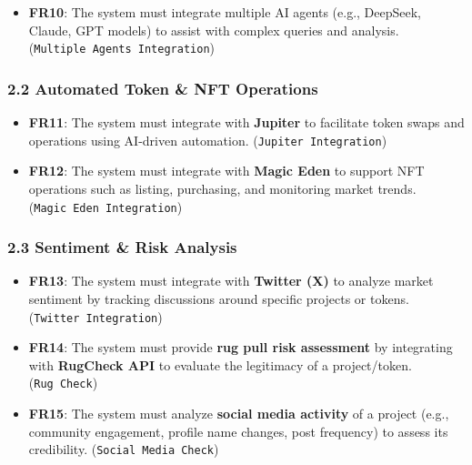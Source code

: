 \documentclass[
]{article}
\providecommand{\tightlist}{%
  \setlength{\itemsep}{0pt}\setlength{\parskip}{0pt}}
\begin{document}
\begin{itemize}
\tightlist
\item
  \textbf{FR10}: The system must integrate multiple AI agents (e.g.,
  DeepSeek, Claude, GPT models) to assist with complex queries and
  analysis. (\texttt{Multiple\ Agents\ Integration})
\end{itemize}

\hypertarget{automated-token-nft-operations}{%
\subsubsection{\texorpdfstring{\textbf{2.2 Automated Token \& NFT
Operations}}{2.2 Automated Token \& NFT Operations}}\label{automated-token-nft-operations}}

\begin{itemize}
\tightlist
\item
  \textbf{FR11}: The system must integrate with \textbf{Jupiter} to
  facilitate token swaps and operations using AI-driven automation.
  (\texttt{Jupiter\ Integration})
\item
  \textbf{FR12}: The system must integrate with \textbf{Magic Eden} to
  support NFT operations such as listing, purchasing, and monitoring
  market trends. (\texttt{Magic\ Eden\ Integration})
\end{itemize}

\hypertarget{sentiment-risk-analysis}{%
\subsubsection{\texorpdfstring{\textbf{2.3 Sentiment \& Risk
Analysis}}{2.3 Sentiment \& Risk Analysis}}\label{sentiment-risk-analysis}}

\begin{itemize}
\tightlist
\item
  \textbf{FR13}: The system must integrate with \textbf{Twitter (X)} to
  analyze market sentiment by tracking discussions around specific
  projects or tokens. (\texttt{Twitter\ Integration})
\item
  \textbf{FR14}: The system must provide \textbf{rug pull risk
  assessment} by integrating with \textbf{RugCheck API} to evaluate the
  legitimacy of a project/token. (\texttt{Rug\ Check})
\item
  \textbf{FR15}: The system must analyze \textbf{social media activity}
  of a project (e.g., community engagement, profile name changes, post
  frequency) to assess its credibility. (\texttt{Social\ Media\ Check})
\end{itemize}
\end{document}
